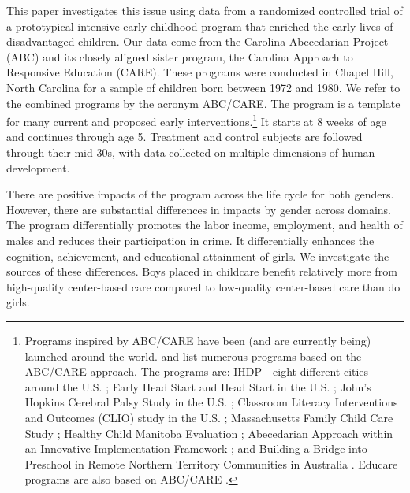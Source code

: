 This paper investigates this issue using data from a randomized controlled trial of a prototypical intensive early childhood program that enriched the early lives of disadvantaged children. Our data come from the Carolina Abecedarian Project (ABC) and its closely aligned sister program, the Carolina Approach to Responsive Education (CARE). These programs were conducted in Chapel Hill, North Carolina for a sample of children born between 1972 and 1980. We refer to the combined programs by the acronym ABC/CARE. The program is a template for many current and proposed early interventions.\footnote{Programs inspired by ABC/CARE have been (and are currently being) launched around the world. \citet{Sparling_2010_Highlights} and \citet{Ramey_Ramey_Lanzi_2014_Interventions} list numerous programs based on the ABC/CARE approach. The programs are: IHDP---eight different cities around the U.S. \citep{Spiker-etal_1997_Helping}; Early Head Start and Head Start in the U.S. \citep{Schneider_McDonald-eds_2007_Scale-Up_Vol-1}; John's Hopkins Cerebral Palsy Study in the U.S. \citep{Sparling_2010_Highlights}; Classroom Literacy Interventions and Outcomes (CLIO) study in the U.S. \citep{Sparling_2010_Highlights}; Massachusetts Family Child Care Study \citep{Collins_etal_2010_Massachusetts-Study}; Healthy Child Manitoba Evaluation \citep{Healthy_Child_Manitoba_2015_Starting-Early}; Abecedarian Approach within an Innovative Implementation Framework \citep{Jensen_Nielsen_2016_ABC-Programme-Pilot}; and Building a Bridge into Preschool in Remote Northern Territory Communities in Australia \citep{UMonash_Dataset_2015_URL}. Educare programs are also based on ABC/CARE \citep{Educare_2014_Research_Agenda,Yazejian_Bryant_2012_Educare}.} It starts at 8 weeks of age and continues through age 5. Treatment and control subjects are followed through their mid 30s, with data collected on multiple dimensions of human development.

There are positive impacts of the program across the life cycle for both genders. However, there are substantial differences in impacts by gender across domains. The program differentially promotes the labor income, employment, and health of males and reduces their participation in crime. It differentially enhances the cognition, achievement, and educational attainment of girls. We investigate the sources of these differences. Boys placed in childcare benefit relatively more from high-quality center-based care compared to low-quality center-based care than do girls.

